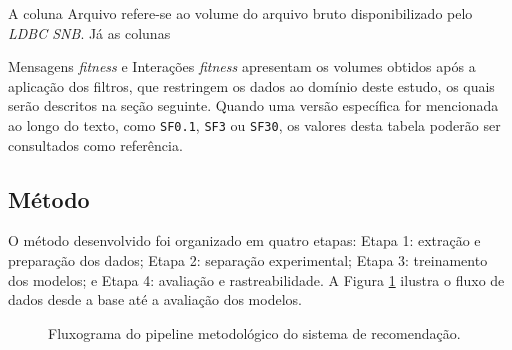 \documentclass[a4paper,12pt]{article}
\begin{document}
A coluna Arquivo refere-se ao volume do arquivo bruto disponibilizado pelo \textit{LDBC SNB}. Já as colunas {Mensagens \textit{fitness} e Interações \textit{fitness} apresentam os volumes obtidos após a aplicação dos filtros, que restringem os dados ao domínio deste estudo, os quais serão descritos na seção seguinte. Quando uma versão específica for mencionada ao longo do texto, como \texttt{SF0.1}, \texttt{SF3} ou \texttt{SF30}, os valores desta tabela poderão ser consultados como referência.

\subsection{Método}

O método desenvolvido foi organizado em quatro etapas: Etapa 1: extração e preparação dos dados; Etapa 2: separação experimental; Etapa 3: treinamento dos modelos; e Etapa 4: avaliação e rastreabilidade. A Figura \ref{fig:fluxograma_metodologia} ilustra o fluxo de dados desde a base até a avaliação dos modelos.

\begin{figure}[H]
\centering
\caption{Fluxograma do pipeline metodológico do sistema de recomendação.}
\label{fig:fluxograma_metodologia}
\end{figure}}
\end{document}
